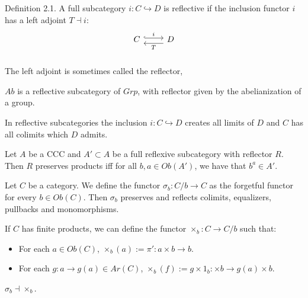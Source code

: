 \begin{definition}
Definition 2.1. A full subcategory $i:C\hookrightarrow D$ is reflective if the inclusion functor $i$ has a left adjoint $T\dashv i$:
  \[
    \begin{tikzcd}
      C\arrow[hookrightarrow, shift left=.5ex, "i"{name=T}]{r}{} &
      D\arrow[ shift left=1ex, "T"{name=i}]{l}{} \\
    \end{tikzcd}
  \]
The left adjoint is sometimes called the reflector,
\end{definition}

\begin{example}
  $Ab$ is a reflective subcategory of $Grp$, with reflector given by the abelianization of a group.
\end{example}


\begin{proposition}
In reflective subcategories the inclusion $i:C\hookrightarrow D$ creates all limits of $D$ and $C$ has all colimits which $D$ admits.
\end{proposition}


\begin{theorem}
Let $A$ be a CCC and $A'\subset A$ be a full reflexive subcategory with reflector  $R$. Then $R$ preserves products iff for all $b,a\in Ob(A')$, we have that $b^a\in A'$.
\end{theorem}
\begin{corollary}
Let $C$ be a category. We define the functor $\sigma_b : C/b \to C$ as the forgetful functor for every $b\in Ob(C)$. Then $\sigma_b$ preserves and reflects colimits, equalizers, pullbacks and monomorphisms.
\end{corollary}

If $C$ has finite products, we can define the functor $\times_b: C \to C/b$ such that:
\begin{itemize}
\item For each $a\in Ob(C)$, $\times_b(a) := \pi':a\times b \to b$.
\item For each $g:a\to g(a)\in Ar(C)$, $\times_b(f) := g\times 1_{b}: \times b \to g(a)\times b$.
\end{itemize}

\begin{proposition}
  $\sigma_b \dashv \times_b$.\\
\end{proposition}

